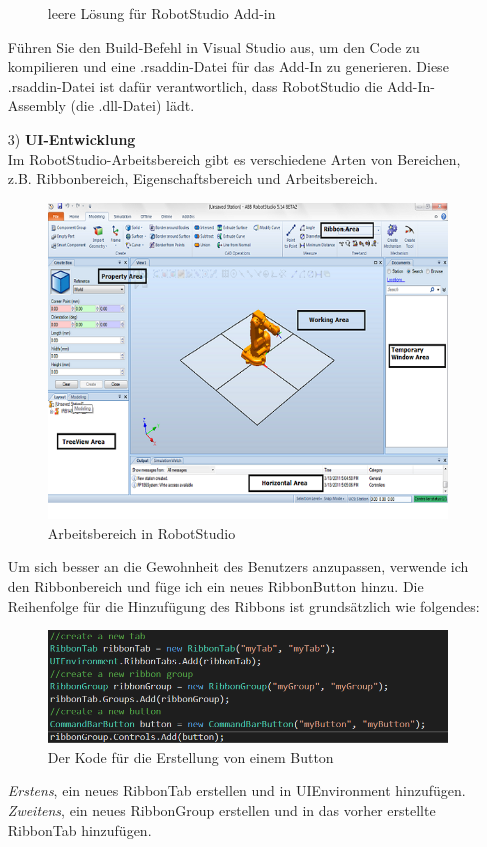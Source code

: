 \documentclass[14pt,a4paper,titlepage]{article}
\begin{document}
\begin{itemize}
\begin{figure}[h!]
					\caption{leere Lösung für RobotStudio Add-in}
					\end{figure}
				\bigbreak
				Führen Sie den Build-Befehl in Visual Studio aus, um den Code zu kompilieren und eine .rsaddin-Datei für das Add-In zu generieren. Diese .rsaddin-Datei ist dafür verantwortlich, dass RobotStudio die Add-In-Assembly (die .dll-Datei) lädt.
				\item[3)]
				\textbf{UI-Entwicklung}
				\\
				Im RobotStudio-Arbeitsbereich gibt es verschiedene Arten von Bereichen, z.B. Ribbonbereich, Eigenschaftsbereich und Arbeitsbereich.\bigbreak
					\begin{figure}[h!]
						\centering
						\includegraphics[width=0.6\linewidth]{workarea.png}
						\caption{Arbeitsbereich in RobotStudio}
					\end{figure}
				Um sich besser an die Gewohnheit des Benutzers anzupassen, verwende ich den Ribbonbereich und füge ich ein neues RibbonButton hinzu. 
				Die Reihenfolge für die Hinzufügung des Ribbons ist grundsätzlich wie folgendes:\\
					\begin{figure}[h!]
						\centering
						\includegraphics[width=0.8\linewidth]{createbutton.png}
						\caption{Der Kode für die Erstellung von einem Button}
					\end{figure}
				\pagebreak
				\emph{Erstens}, ein neues RibbonTab erstellen und in UIEnvironment hinzufügen.\\
				\emph{Zweitens},
				 ein neues RibbonGroup erstellen und in das vorher erstellte RibbonTab hinzufügen.\\

\end{itemize}
\end{document}
